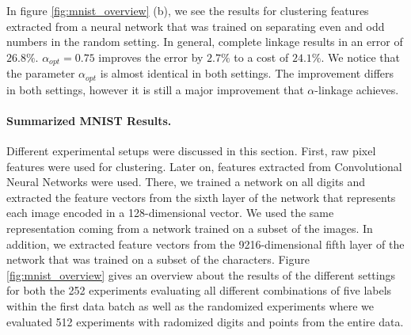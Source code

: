 In figure \ref{fig:mnist_overview} (b), we see the results for clustering features extracted from a neural network that was trained on separating even and odd numbers in the random setting. In general, complete linkage results in an error of $26.8\%$. $\alpha_{opt} = 0.75$ improves the error by $2.7\%$ to a cost of $24.1\%$. We notice that the parameter $\alpha_{opt}$ is almost identical in both settings. The improvement differs in both settings, however it is still a major improvement that $\alpha$-linkage achieves.

\paragraph{Summarized MNIST Results.} Different experimental setups were discussed in this section. First, raw pixel features were used for clustering. Later on, features extracted from Convolutional Neural Networks were used. There, we trained a network on all digits and extracted the feature vectors from the sixth layer of the network that represents each image encoded in a 128-dimensional vector. We used the same representation coming from a network trained on a subset of the images. In addition, we extracted feature vectors from the 9216-dimensional fifth layer of the network that was trained on a subset of the characters. Figure \ref{fig:mnist_overview} gives an overview about the results of the different settings for both the 252 experiments evaluating all different combinations of five labels within the first data batch as well as the randomized experiments where we evaluated 512 experiments with radomized digits and points from the entire data.

